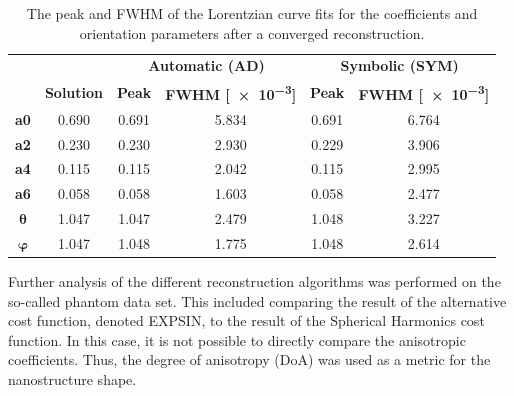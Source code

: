 \begin{table}[h!]
    \centering
    \caption{  The peak and FWHM of the Lorentzian curve fits
        for the coefficients and orientation parameters after a converged reconstruction.}
    \label{tab:curve_fitting}
    \begin{tabular}{ c c c c c c }
        \hline %
        \textbf{}      &                   & \multicolumn{2}{c}{\textbf{Automatic (AD)}} & \multicolumn{2}{c}{\textbf{Symbolic (SYM)}}                                             \\
        \textbf{}      & \textbf{Solution} & \textbf{Peak}                               & \textbf{FWHM [\num{e-3}]}                   & \textbf{Peak} & \textbf{FWHM [\num{e-3}]} \\
        \hline %
        \textbf{a0}    & 0.690             & 0.691                                       & 5.834                                       & 0.691         & 6.764                     \\
        \textbf{a2}    & 0.230             & 0.230                                       & 2.930                                       & 0.229         & 3.906                     \\
        \textbf{a4}    & 0.115             & 0.115                                       & 2.042                                       & 0.115         & 2.995                     \\
        \textbf{a6}    & 0.058             & 0.058                                       & 1.603                                       & 0.058         & 2.477                     \\
        $\bm{\theta}$  & 1.047             & 1.047                                       & 2.479                                       & 1.048         & 3.227                     \\
        $\bm{\varphi}$ & 1.047             & 1.048                                       & 1.775                                       & 1.048         & 2.614                     \\
        \hline %
    \end{tabular}
\end{table}

\clearpage

Further analysis of the different reconstruction algorithms was performed on the so-called phantom data set.
This included comparing the result of the alternative cost function, denoted EXPSIN, to the result of the Spherical Harmonics cost function.
In this case, it is not possible to directly compare the anisotropic coefficients. Thus, the degree of anisotropy (DoA) was used as a metric for the nanostructure shape.

